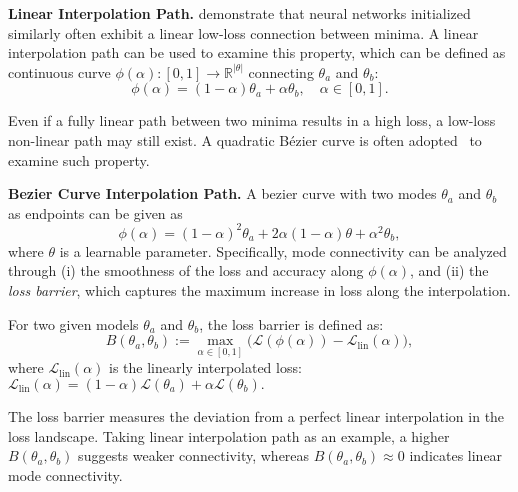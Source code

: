 \noindent\textbf{Linear Interpolation Path.}  
\citet{frankle2020linear,qin2022exploring} demonstrate that neural networks initialized similarly often exhibit a linear low-loss connection between minima. A linear interpolation path can be used to examine this property, which can be defined as continuous curve $\phi(\alpha): [0, 1] \to \mathbb{R}^{|\theta|}$ connecting $\theta_a$ and $\theta_b$:
\begin{equation}
    \phi(\alpha) = (1 - \alpha) \theta_a + \alpha \theta_b, \quad \alpha \in [0,1].
\end{equation}

Even if a fully linear path between two minima results in a high loss, a low-loss non-linear path may still exist. A quadratic Bézier curve is often adopted~\cite{garipov2018loss,gotmare2018using,draxler2018essentially} to examine such property.

\noindent\textbf{Bezier Curve Interpolation Path.} A bezier curve with  two modes $\theta_{a}$ and $\theta_{b}$ as endpoints can be given as 
\begin{equation}
\phi(\alpha) = (1-\alpha)^2 \theta_{a} + 2\alpha(1-\alpha) \theta + \alpha^2 \theta_{b},
\end{equation}
where $\theta$ is a learnable parameter. Specifically, mode connectivity can be analyzed through  
(i) the smoothness of the loss and accuracy along $\phi(\alpha)$, and  
(ii) the \textit{loss barrier}, which captures the maximum increase in loss along the interpolation.


\begin{definition}
For two given models $\theta_a$ and $\theta_b$, the loss barrier is defined as:
\begin{equation}
    B(\theta_a, \theta_b) := \max_{\alpha \in [0,1]} 
    \Big( \mathcal{L}(\phi(\alpha)) - \mathcal{L}_{\text{lin}}(\alpha) \Big),
\end{equation}
where $\mathcal{L}_{\text{lin}}(\alpha)$ is the linearly interpolated loss: $\mathcal{L}_{\text{lin}}(\alpha) = (1-\alpha) \mathcal{L}(\theta_a) + \alpha \mathcal{L}(\theta_b). $
\end{definition}

The loss barrier measures the deviation from a perfect linear interpolation in the loss landscape. Taking linear interpolation path as an example, a higher $B(\theta_a, \theta_b)$ suggests weaker connectivity, whereas $B(\theta_a, \theta_b) \approx 0$ indicates linear mode connectivity.  


